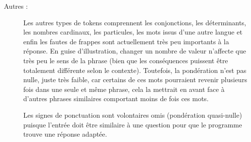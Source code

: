 \begin{description}
  \item[Autres :] Les autres types de tokens comprennent les conjonctions, les déterminants, les nombres cardinaux, les particules, les mots issus d'une autre langue et enfin les fautes de frappes sont actuellement très peu importants à la réponse. En guise d'illustration, changer un nombre de valeur n'affecte que très peu le sens de la phrase (bien que les conséquences puissent être totalement différente selon le contexte). Toutefois, la pondération n'est pas nulle, juste très faible, car certains de ces mots pourraient revenir plusieurs fois dans une seule et même phrase, cela la mettrait en avant face à d'autres phrases similaires comportant moins de fois ces mots.

  Les signes de ponctuation sont volontaires omis (pondération quasi-nulle) puisque l'entrée doit être similaire à une question pour que le programme trouve une réponse adaptée.
\end{description}